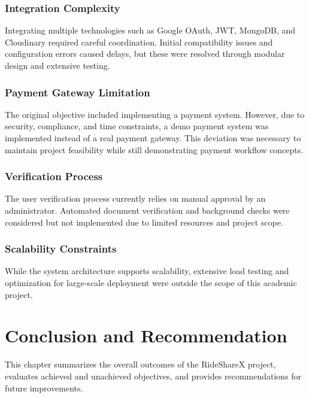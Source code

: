 \documentclass[12pt,a4paper]{report}
\begin{document}
\subsection{Integration Complexity}

Integrating multiple technologies such as Google OAuth\cite{oauth}, JWT\cite{jwt}, MongoDB\cite{mongodb}, and Cloudinary\cite{cloudinary} required careful coordination. Initial compatibility issues and configuration errors caused delays, but these were resolved through modular design and extensive testing.

\subsection{Payment Gateway Limitation}

The original objective included implementing a payment system. However, due to security, compliance, and time constraints, a demo payment system was implemented instead of a real payment gateway. This deviation was necessary to maintain project feasibility while still demonstrating payment workflow concepts.

\subsection{Verification Process}

The user verification process currently relies on manual approval by an administrator. Automated document verification and background checks were considered but not implemented due to limited resources and project scope.

\subsection{Scalability Constraints}

While the system architecture supports scalability, extensive load testing and optimization for large-scale deployment were outside the scope of this academic project.

\chapter{Conclusion and Recommendation}

This chapter summarizes the overall outcomes of the RideShareX project, evaluates achieved and unachieved objectives, and provides recommendations for future improvements.
\end{document}
